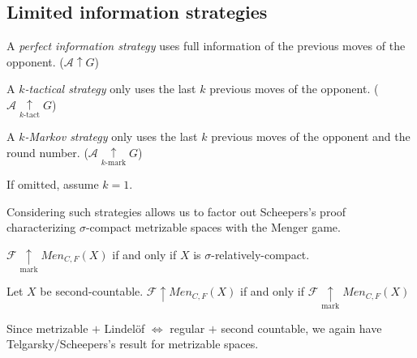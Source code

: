 \documentclass{beamer}
\theoremstyle{example}
\theoremstyle{definition}
\newcommand{\win}{\uparrow}
\newcommand{\markwin}{\underset{\text{mark}}{\uparrow}}
\newcommand{\kmarkwin}[1]{\underset{#1\text{-mark}}{\uparrow}}
\newcommand{\ktactwin}[1]{\underset{#1\text{-tact}}{\uparrow}}
\newcommand{\menGame}[1]{Men_{C,F}\left({#1}\right)}
\newcommand{\<}{\langle}
\renewcommand{\>}{\rangle}
\newcommand{\pl}[1]{\mathscr{#1}}
\newcommand{\term}{\textit}
\begin{document}
\subsection{Limited information strategies}

\begin{frame}

  \begin{definition}
    A \term{perfect information strategy} uses full information of the
    previous moves of the opponent. (\(\pl A\win G\))
  \end{definition}

  \pause

  \begin{definition}
    A \term{$k$-tactical strategy} only uses the last \(k\)
    previous moves of the opponent. (\(\pl A\ktactwin{k} G\))
  \end{definition}

  \pause

  \begin{definition}
    A \term{$k$-Markov strategy} only uses the last \(k\)
    previous moves of the opponent and the round number.
    (\(\pl A\kmarkwin{k} G\))
  \end{definition}

  \pause

  If omitted, assume \(k=1\).

\end{frame}

\begin{frame}\small
  Considering such strategies allows us to factor out Scheepers's proof
  characterizing \(\sigma\)-compact metrizable spaces with the Menger
  game.

  \pause

  \begin{lemma}
    \(\pl F\markwin\menGame X\) if and only if \(X\) is
    \(\sigma\)-relatively-compact.
  \end{lemma}

  \pause

  \begin{lemma}
    Let \(X\) be second-countable.
    \(\pl F\win\menGame X\) if and only if
    \(\pl F\markwin\menGame X\)
  \end{lemma}

  \pause

  Since metrizable \(+\) Lindel\"of
  \(\Leftrightarrow\) regular \(+\) second countable, we again have
  Telgarsky/Scheepers's result for metrizable spaces.
\end{frame}
\end{document}
